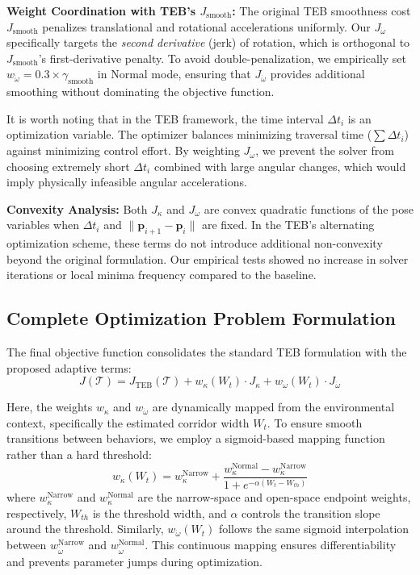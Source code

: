 \documentclass[lettersize,journal]{IEEEtran}
\begin{document}
\textbf{Weight Coordination with TEB's $J_{\text{smooth}}$:} The original TEB smoothness cost $J_{\text{smooth}}$ penalizes translational and rotational accelerations uniformly. Our $J_{\dot{\omega}}$ specifically targets the \textit{second derivative} (jerk) of rotation, which is orthogonal to $J_{\text{smooth}}$'s first-derivative penalty. To avoid double-penalization, we empirically set $w_{\dot{\omega}} = 0.3 \times \gamma_{\text{smooth}}$ in Normal mode, ensuring that $J_{\dot{\omega}}$ provides additional smoothing without dominating the objective function.

It is worth noting that in the TEB framework, the time interval $\Delta t_i$ is an optimization variable. The optimizer balances minimizing traversal time ($\sum \Delta t_i$) against minimizing control effort. By weighting $J_{\dot{\omega}}$, we prevent the solver from choosing extremely short $\Delta t_i$ combined with large angular changes, which would imply physically infeasible angular accelerations.

\textbf{Convexity Analysis:} Both $J_{\kappa}$ and $J_{\dot{\omega}}$ are convex quadratic functions of the pose variables when $\Delta t_i$ and $\|\mathbf{p}_{i+1} - \mathbf{p}_i\|$ are fixed. In the TEB's alternating optimization scheme, these terms do not introduce additional non-convexity beyond the original formulation. Our empirical tests showed no increase in solver iterations or local minima frequency compared to the baseline.

\subsection{Complete Optimization Problem Formulation}
The final objective function consolidates the standard TEB formulation with the proposed adaptive terms:
\begin{equation}
J(\mathcal{T}) = J_{\text{TEB}}(\mathcal{T}) + w_{\kappa}(W_t) \cdot J_{\kappa} + w_{\dot{\omega}}(W_t) \cdot J_{\dot{\omega}}
\end{equation}

Here, the weights $w_{\kappa}$ and $w_{\dot{\omega}}$ are dynamically mapped from the environmental context, specifically the estimated corridor width $W_t$. To ensure smooth transitions between behaviors, we employ a sigmoid-based mapping function rather than a hard threshold:
\begin{equation}
w_{\kappa}(W_t) = w_{\kappa}^{\text{Narrow}} + \frac{w_{\kappa}^{\text{Normal}} - w_{\kappa}^{\text{Narrow}}}{1 + e^{-\alpha(W_t - W_{th})}}
\end{equation}
where $w_{\kappa}^{\text{Narrow}}$ and $w_{\kappa}^{\text{Normal}}$ are the narrow-space and open-space endpoint weights, respectively, $W_{th}$ is the threshold width, and $\alpha$ controls the transition slope around the threshold. Similarly, $w_{\dot{\omega}}(W_t)$ follows the same sigmoid interpolation between $w_{\dot{\omega}}^{\text{Narrow}}$ and $w_{\dot{\omega}}^{\text{Normal}}$. This continuous mapping ensures differentiability and prevents parameter jumps during optimization.
\end{document}
